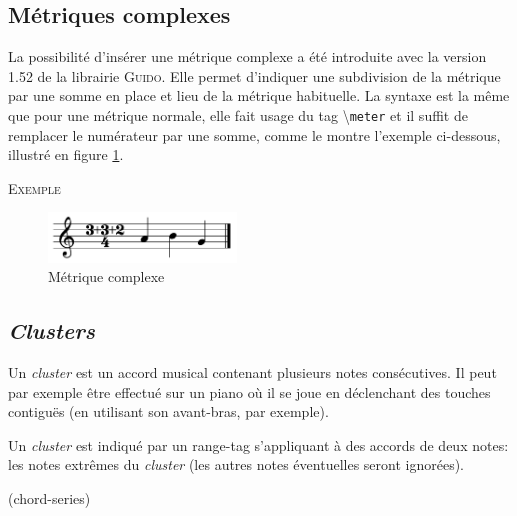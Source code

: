 \documentclass{article}
\newenvironment{gmncode}	{\vspace{-2mm}\small\verbatim}{\endverbatim\vspace{-2mm}}
\newcommand{\guido}			{\textsc{Guido}}
\newcommand{\code}[1]		{{\small \texttt{#1}}}
\newcommand{\guidotag}[1]	{\textbackslash\code{#1}}
\newcommand{\exemple}		{\vspace{2mm}\hspace*{-6mm}\textsc{Exemple}}
\begin{document}
\subsection{Métriques complexes}\label{subsec:metriques}

La possibilité d'insérer une métrique complexe a été introduite avec la version 1.52 de la librairie \guido{}. Elle permet d'indiquer une subdivision de la métrique par une somme en place et lieu de la métrique habituelle. La syntaxe est la même que pour une métrique normale, elle fait usage du tag \guidotag{meter} et il suffit de remplacer le numérateur par une somme, comme le montre l'exemple ci-dessous, illustré en figure \ref{fig:complexMeter}.

\exemple\\
\begin{gmncode}
  [ \meter<"3+3+2/4"> a b g ]
\end{gmncode}

\begin{figure}[h]
\centering
\includegraphics[width=50mm]{img/partitions/complexMeter.pdf}
\caption{Métrique complexe}
\label{fig:complexMeter}
\end{figure}

\subsection{\emph{Clusters}}\label{subsec:clusters}

Un \emph{cluster} est un accord musical contenant plusieurs notes consécutives. Il peut par exemple être effectué sur un piano où il se joue en déclenchant des touches contiguës (en utilisant son avant-bras, par exemple).

Un \emph{cluster} est indiqué par un range-tag s'appliquant à des accords de deux notes: les notes extrêmes du \emph{cluster} (les autres notes éventuelles seront ignorées).

\begin{gmncode}
(chord-series)
\end{gmncode}
\end{document}
